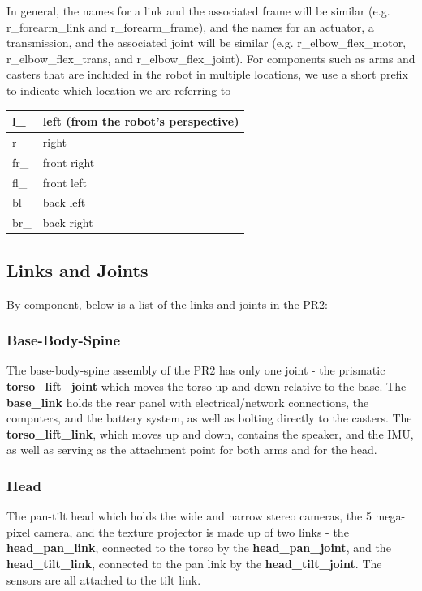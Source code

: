 In general, the names for a link and the associated frame will be similar
(e.g. r\_forearm\_link and r\_forearm\_frame), and the names for an actuator, a
transmission, and the associated joint will be similar
(e.g. r\_elbow\_flex\_motor, r\_elbow\_flex\_trans, and r\_elbow\_flex\_joint).
For components such as arms and casters that are included in the robot in
multiple locations, we use a short prefix to indicate which location we are
referring to

\begin{tabular}{| l | l |}
\hline
  l\_ & left (from the robot's perspective) \\ \hline
  r\_ & right \\ \hline
  fr\_ & front right \\ \hline
  fl\_ & front left \\ \hline
  bl\_ & back left \\ \hline
  br\_ & back right \\ \hline
\end{tabular}

\subsection{Links and Joints}
By component, below is a list of the links and joints in the PR2:
\subsubsection{Base-Body-Spine}
The base-body-spine assembly of the PR2 has only one joint - the prismatic {\bf
  torso\_lift\_joint} which moves the torso up and down relative to the base.
The {\bf base\_link} holds the rear panel with electrical/network connections,
the computers, and the battery system, as well as bolting directly to the
casters.  The {\bf torso\_lift\_link}, which moves up and down, contains the
speaker, and the IMU, as well as serving as the attachment point for both arms
and for the head.
\subsubsection{Head}
The pan-tilt head which holds the wide and narrow stereo cameras, the 5
mega-pixel camera, and the texture projector is made up of two links - the {\bf
  head\_pan\_link}, connected to the torso by the {\bf head\_pan\_joint}, and
the {\bf head\_tilt\_link}, connected to the pan link by the {\bf
  head\_tilt\_joint}.  The sensors are all attached to the tilt link.

